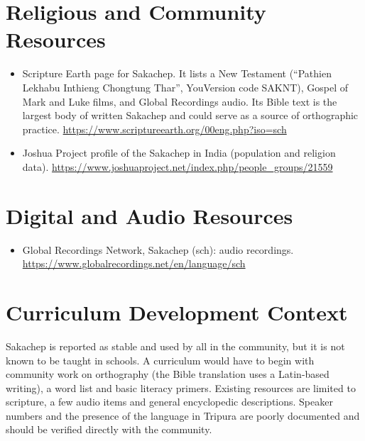 \documentclass[12pt]{article}
\begin{document}
\section{Religious and Community Resources}
\begin{itemize}
\item Scripture Earth page for Sakachep. It lists a New Testament (``Pathien Lekhabu Inthieng Chongtung Thar'', YouVersion code SAKNT), Gospel of Mark and Luke films, and Global Recordings audio. Its Bible text is the largest body of written Sakachep and could serve as a source of orthographic practice. \url{https://www.scriptureearth.org/00eng.php?iso=sch}
\item Joshua Project profile of the Sakachep in India (population and religion data). \url{https://www.joshuaproject.net/index.php/people_groups/21559}
\end{itemize}

\section{Digital and Audio Resources}
\begin{itemize}
\item Global Recordings Network, Sakachep (sch): audio recordings. \url{https://www.globalrecordings.net/en/language/sch}
\end{itemize}

\section{Curriculum Development Context}
Sakachep is reported as stable and used by all in the community, but it is not known to be taught in schools. A curriculum would have to begin with community work on orthography (the Bible translation uses a Latin-based writing), a word list and basic literacy primers. Existing resources are limited to scripture, a few audio items and general encyclopedic descriptions. Speaker numbers and the presence of the language in Tripura are poorly documented and should be verified directly with the community.
\end{document}

